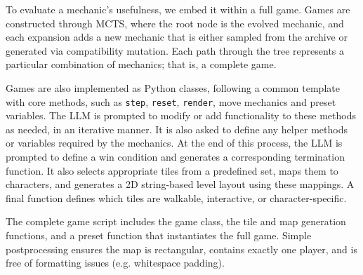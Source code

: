 \documentclass{article} %
\begin{document}
To evaluate a mechanic’s usefulness, we embed it within a full game. Games are constructed through MCTS, where the root node is the evolved mechanic, and each expansion adds a new mechanic that is either sampled from the archive or generated via compatibility mutation. Each path through the tree represents a particular combination of mechanics; that is, a complete game.

Games are also implemented as Python classes, following a common template with core methods, such as \texttt{step}, \texttt{reset}, \texttt{render}, move mechanics and preset variables. The LLM is prompted to modify or add functionality to these methods as needed, in an iterative manner. It is also asked to define any helper methods or variables required by the mechanics.
At the end of this process, the LLM is prompted to define a win condition and generates a corresponding termination function. It also selects appropriate tiles from a predefined set, maps them to characters, and generates a 2D string-based level layout using these mappings. A final function defines which tiles are walkable, interactive, or character-specific.

The complete game script includes the game class, 
the tile and map generation functions, and a preset function that instantiates the full game.
Simple postprocessing ensures the map is rectangular, contains exactly one player, and is free of formatting issues (e.g. whitespace padding).




\end{document}
